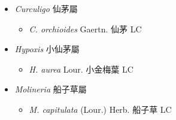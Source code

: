
  \begin{itemize}
 \item[] \textit{Curculigo} 仙茅屬
                                
  \begin{itemize}
        \item[] \textit{C. orchioides} Gaertn.  仙茅   LC
  \end{itemize}
 \item[] \textit{Hypoxis} 小仙茅屬
                                
  \begin{itemize}
        \item[] \textit{H. aurea} Lour.  小金梅葉   LC
  \end{itemize}
 \item[] \textit{Molineria} 船子草屬
                                
  \begin{itemize}
        \item[] \textit{M. capitulata} (Lour.) Herb.  船子草   LC
  \end{itemize}
  \end{itemize}
